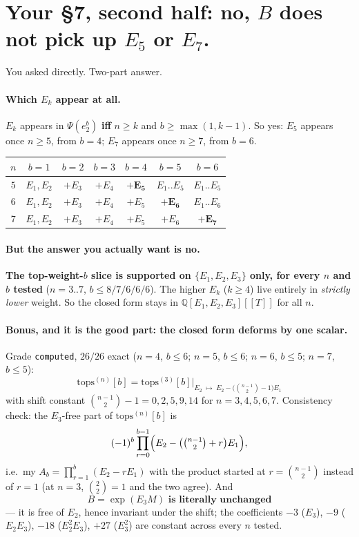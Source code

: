 \documentclass[11pt,a4paper]{article}
\newcommand{\Q}{\mathbb{Q}}
\theoremstyle{plain}
\theoremstyle{definition}
\begin{document}
\section{Your \S7, second half: no, $B$ does not pick up $E_5$ or $E_7$.}

You asked directly. Two-part answer.

\paragraph{Which $E_k$ appear at all.} $E_k$ appears in $\Psi(e_2^b)$ \textbf{iff} $n\ge k$
and $b\ge\max(1,k-1)$. So yes: $E_5$ appears once $n\ge5$, from $b=4$; $E_7$ appears once
$n\ge7$, from $b=6$.

\begin{center}
\begin{tabular}{@{}c|c|c|c|c|c|c@{}}
\toprule
$n$ & $b=1$ & $b=2$ & $b=3$ & $b=4$ & $b=5$ & $b=6$\\
\midrule
$5$ & $E_1,E_2$ & $+E_3$ & $+E_4$ & $\mathbf{+E_5}$ & $E_1..E_5$ & $E_1..E_5$\\
$6$ & $E_1,E_2$ & $+E_3$ & $+E_4$ & $+E_5$ & $\mathbf{+E_6}$ & $E_1..E_6$\\
$7$ & $E_1,E_2$ & $+E_3$ & $+E_4$ & $+E_5$ & $+E_6$ & $\mathbf{+E_7}$\\
\bottomrule
\end{tabular}
\end{center}

\paragraph{But the answer you actually want is no.} \textbf{The top-weight-$b$ slice is
supported on $\{E_1,E_2,E_3\}$ only, for every $n$ and $b$ tested} ($n=3..7$, $b\le8/7/6/6/6$).
The higher $E_k$ ($k\ge4$) live entirely in \emph{strictly lower} weight. So the closed form
stays in $\Q[E_1,E_2,E_3][[T]]$ for all $n$.

\paragraph{Bonus, and it is the good part: the closed form deforms by one scalar.} Grade
\texttt{computed}, $26/26$ exact ($n=4$, $b\le6$; $n=5$, $b\le6$; $n=6$, $b\le5$; $n=7$,
$b\le5$):
\[
\boxed{\ \mathrm{tops}^{(n)}[b]=\mathrm{tops}^{(3)}[b]\Big|_{E_2\;\mapsto\;
E_2-\bigl(\binom{n-1}2-1\bigr)E_1}\ }
\]
with shift constant $\binom{n-1}2-1=0,2,5,9,14$ for $n=3,4,5,6,7$. Consistency check: the
$E_3$-free part of $\mathrm{tops}^{(n)}[b]$ is
\[
(-1)^b\prod_{r=0}^{b-1}\Bigl(E_2-\bigl(\tbinom{n-1}2+r\bigr)E_1\Bigr),
\]
i.e.\ my $A_b=\prod_{r=1}^{b}(E_2-rE_1)$ with the product started at $r=\binom{n-1}2$
instead of $r=1$ (at $n=3$, $\binom22=1$ and the two agree). And
\[
\textbf{$B=\exp(E_3M)$ is literally unchanged}
\]
--- it is free of $E_2$, hence invariant under the shift; the coefficients $-3$ ($E_3$),
$-9$ ($E_2E_3$), $-18$ ($E_2^2E_3$), $+27$ ($E_3^2$) are constant across every $n$ tested.
\end{document}
